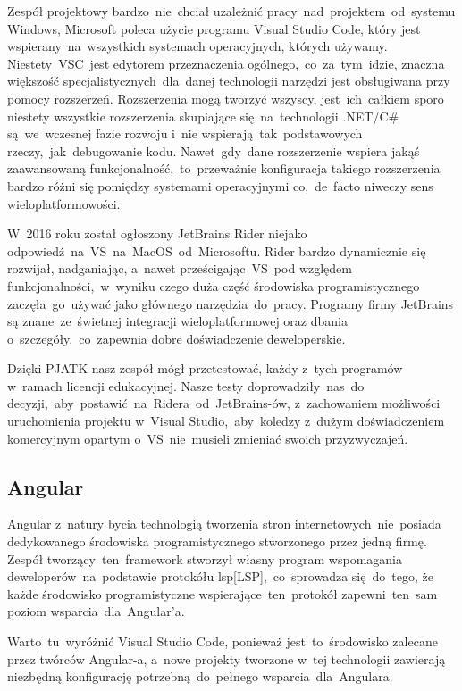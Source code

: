 Zespół projektowy bardzo~nie~chciał uzależnić pracy~nad~projektem~od~systemu Windows, Microsoft poleca użycie programu Visual Studio Code, który jest wspierany~na~wszystkich systemach operacyjnych, których używamy.
Niestety~VSC~jest edytorem przeznaczenia ogólnego,~co~za~tym~idzie, znaczna większość specjalistycznych~dla~danej technologii narzędzi jest obsługiwana przy pomocy rozszerzeń.
Rozszerzenia mogą tworzyć wszyscy, jest~ich~całkiem sporo niestety wszystkie rozszerzenia skupiające się~na~technologii .NET/C\# są~we~wczesnej fazie rozwoju i~nie wspierają~tak~podstawowych rzeczy,~jak~debugowanie kodu.
Nawet~gdy~dane rozszerzenie wspiera jakąś zaawansowaną funkcjonalność,~to~przeważnie konfiguracja takiego rozszerzenia bardzo różni się pomiędzy systemami operacyjnymi co,~de~facto niweczy sens wieloplatformowości.

W~2016 roku został ogłoszony JetBrains Rider niejako odpowiedź~na~VS~na~MacOS~od~Microsoftu.
Rider bardzo dynamicznie się rozwijał, nadganiając, a~nawet prześcigając~VS~pod względem funkcjonalności,~w~wyniku czego duża część środowiska programistycznego zaczęła~go~używać jako głównego narzędzia~do~pracy.
Programy firmy JetBrains są znane~ze~świetnej integracji wieloplatformowej oraz dbania o~szczegóły,~co~zapewnia dobre doświadczenie deweloperskie.

Dzięki PJATK nasz zespół mógł przetestować, każdy z~tych programów w~ramach licencji edukacyjnej.
Nasze testy doprowadziły~nas~do decyzji,~aby~postawić~na~Ridera~od~JetBrains-ów, z~zachowaniem możliwości uruchomienia projektu w~Visual Studio,~aby~koledzy z~dużym doświadczeniem komercyjnym opartym o~VS~nie~musieli zmieniać swoich przyzwyczajeń.

\subsection{Angular}\label{subsec:angular}
Angular z~natury bycia technologią tworzenia stron internetowych~nie~posiada dedykowanego środowiska programistycznego stworzonego przez jedną firmę.
Zespół tworzący~ten~framework stworzył własny program wspomagania deweloperów~na~podstawie protokółu \acrshort{lsp}[LSP],~co~sprowadza się~do~tego, że każde środowisko programistyczne wspierające~ten~protokół zapewni~ten~sam poziom wsparcia~dla~Angular'a.

Warto~tu~wyróżnić Visual Studio Code, ponieważ jest~to~środowisko zalecane przez twórców Angular-a, a~nowe projekty tworzone w~tej technologii zawierają niezbędną konfigurację potrzebną~do~pełnego wsparcia~dla~Angulara.

